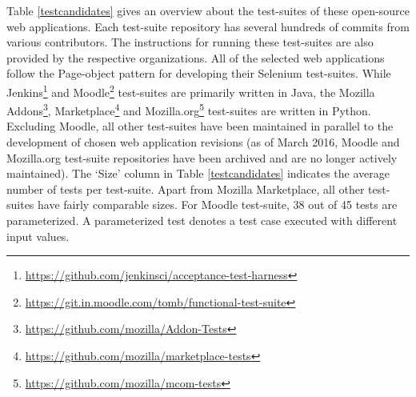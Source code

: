 Table \ref{testcandidates} gives an overview about the test-suites of these open-source web applications. Each test-suite repository has several hundreds of commits from various contributors. The instructions for running these test-suites are also provided by the respective organizations. All of the selected web applications follow the Page-object pattern for developing their Selenium test-suites. While Jenkins\footnote{\url{https://github.com/jenkinsci/acceptance-test-harness}} and Moodle\footnote{\url{https://git.in.moodle.com/tomb/functional-test-suite}} test-suites are primarily written in Java, the Mozilla Addons\footnote{\url{https://github.com/mozilla/Addon-Tests}}, Marketplace{\footnote{\url{https://github.com/mozilla/marketplace-tests}}} and Mozilla.org\footnote{\url{https://github.com/mozilla/mcom-tests}} test-suites are written in Python.
Excluding Moodle, all other test-suites have been maintained in parallel to the development of chosen web application revisions 
(as of March 2016, Moodle and Mozilla.org test-suite repositories have been archived and are no longer actively maintained). The `Size' column in Table \ref{testcandidates} indicates the average number of tests per test-suite. Apart from Mozilla Marketplace, all other test-suites have fairly comparable sizes. For Moodle test-suite, 38 out of 45 tests are parameterized. A parameterized test denotes a test case executed with different input values. 
\begin{table}
\centering
{}
\caption{Overview of Selenium test-suites for candidate web applications}
\label{testcandidates}
\end{table}

